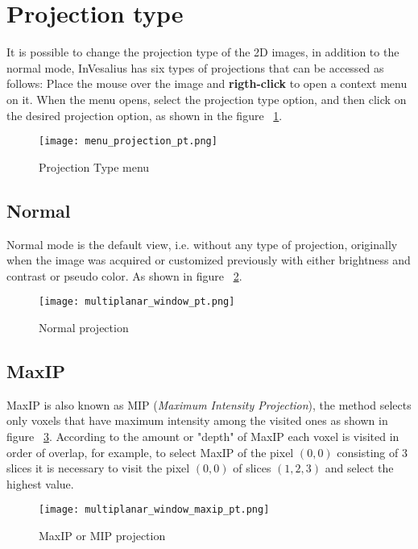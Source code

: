 \newpage

\section{Projection type}

It is possible to change the projection type of the 2D images, in addition to the normal mode, InVesalius has six types of projections that can be accessed as follows: Place the mouse over the image and \textbf{rigth-click} to open a context menu on it. When the menu opens, select the projection type option, and then click on the desired projection option, as shown in the figure ~\ref{fig:menu_proj}.

\begin{figure}[H]
\centering
\texttt{[image: menu\_projection\_pt.png]}
\caption{Projection Type menu}
\label{fig:menu_proj}
\end{figure}

\subsection{Normal}

Normal mode is the default view, i.e. without any type of projection, originally when the image was acquired or customized previously with either brightness and contrast or pseudo color. As shown in figure ~\ref{fig:proj_normal}.

\begin{figure}[H]
\centering
\texttt{[image: multiplanar\_window\_pt.png]}
\caption{Normal projection}
\label{fig:proj_normal}
\end{figure}

\subsection{MaxIP}
\label{sec:max_ip}
MaxIP is also known as MIP (\textit{Maximum Intensity Projection}), the method selects only voxels that have maximum intensity among the visited ones as shown in figure ~\ref{fig:proj_maxip}. According to the amount or "depth" of MaxIP each voxel is visited in order of overlap, for example, to select MaxIP of the pixel $(0,0)$ consisting of 3 slices it is necessary to visit the pixel $(0,0)$ of slices $(1,2,3)$ and select the highest value.

\begin{figure}[H]
\centering
\texttt{[image: multiplanar\_window\_maxip\_pt.png]}
\caption{MaxIP or MIP projection}
\label{fig:proj_maxip}
\end{figure}

